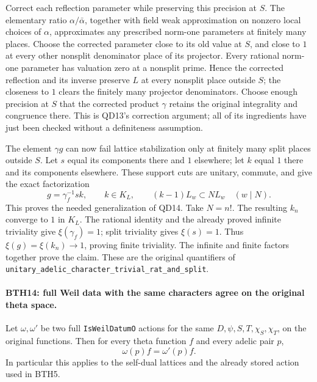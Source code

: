 Correct each reflection parameter while preserving this
precision at \(S\).  The elementary ratio
\(\alpha/\bar\alpha\), together with field weak
approximation on nonzero local choices of \(\alpha\),
approximates any prescribed norm-one parameters at
finitely many places.  Choose the corrected parameter
close to its old value at \(S\), and close to \(1\) at
every other nonsplit denominator place of its projector.
Every rational norm-one parameter has valuation zero at
a nonsplit prime.  Hence the corrected reflection and
its inverse preserve \(L\) at every nonsplit place
outside \(S\); the closeness to \(1\) clears the finitely
many projector denominators.  Choose enough precision
at \(S\) that the corrected product \(\gamma\) retains
the original integrality and congruence there.
This is QD13's correction argument; all of its ingredients
have just been checked without a definiteness assumption.

The element \(\gamma g\) can now fail lattice
stabilization only at finitely many split places outside
\(S\).  Let \(s\) equal its components there and \(1\)
elsewhere; let \(k\) equal \(1\) there and its components
elsewhere.  These support cuts are unitary, commute, and
give the exact factorization
\[
 g=\gamma_f^{-1}s k,\qquad k\in K_L,\qquad
       (k-1)L_w\subset NL_w\quad(w\mid N).                   \tag{BTH.49}
\]
This proves the needed generalization of QD14.
Take \(N=n!\).  The resulting \(k_n\) converge to \(1\)
in \(K_L\).
The rational identity and the already proved infinite
triviality give \(\xi(\gamma_f)=1\);
split triviality gives \(\xi(s)=1\).
Thus \(\xi(g)=\xi(k_n)\to1\), proving finite triviality.
The infinite and finite factors together prove the claim.
These are the original quantifiers of
\texttt{unitary\_\allowbreak adelic\_\allowbreak character\_\allowbreak trivial\_\allowbreak rat\_\allowbreak and\_\allowbreak split}.

\paragraph{BTH14: full Weil data with the same characters agree on the original theta space.}
\label{claim:BTH14}
Let \(\omega,\omega'\) be two full
\texttt{Is\allowbreak Weil\allowbreak Datum\allowbreak O} actions for the same
\(D,\psi,S,T,\chi_S,\chi_T\), on the original functions.
Then for every theta function \(f\) and every adelic
pair \(p\),
\[
                         \omega(p)f=\omega'(p)f.             \tag{BTH.50}
\]
In particular this applies to the self-dual lattices
and the already stored action used in BTH5.

